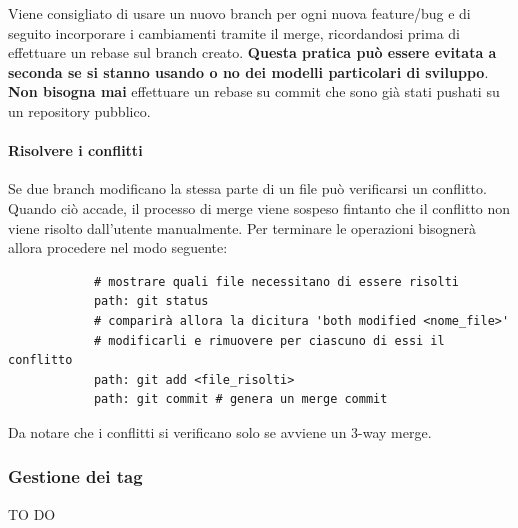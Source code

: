			\noindent
		Viene consigliato di usare un nuovo branch per ogni nuova feature/bug e di seguito incorporare i cambiamenti tramite il merge, ricordandosi prima di effettuare un rebase sul branch creato. \textbf{Questa pratica può essere evitata a seconda se si stanno usando o no dei modelli particolari di sviluppo}. \newline
		\textbf{Non bisogna mai} effettuare un rebase su commit che sono già stati pushati su un repository pubblico.
			\paragraph{Risolvere i conflitti} %
			\label{par:risolvere_i_conflitti}
			Se due branch modificano la stessa parte di un file può verificarsi un conflitto. Quando ciò accade, il processo di merge viene sospeso fintanto che il conflitto non viene risolto dall'utente manualmente. Per terminare le operazioni bisognerà allora procedere nel modo seguente:
			\begin{verbatim}
			# mostrare quali file necessitano di essere risolti
			path: git status
			# comparirà allora la dicitura 'both modified <nome_file>'
			# modificarli e rimuovere per ciascuno di essi il conflitto
			path: git add <file_risolti>
			path: git commit # genera un merge commit
			\end{verbatim}
			Da notare che i conflitti si verificano solo se avviene un 3-way merge.

		\subsubsection{Gestione dei tag} %
		\label{ssub:gestione_dei_tag_locale}
		TO DO


